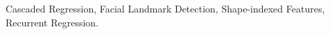 \documentclass[journal]{IEEEtran}
\begin{document}
{\begin{abstract}
%
%
\end{abstract}

\begin{IEEEkeywords}
Cascaded Regression, Facial Landmark Detection, Shape-indexed Features, Recurrent Regression.
\end{IEEEkeywords}}
\end{document}
